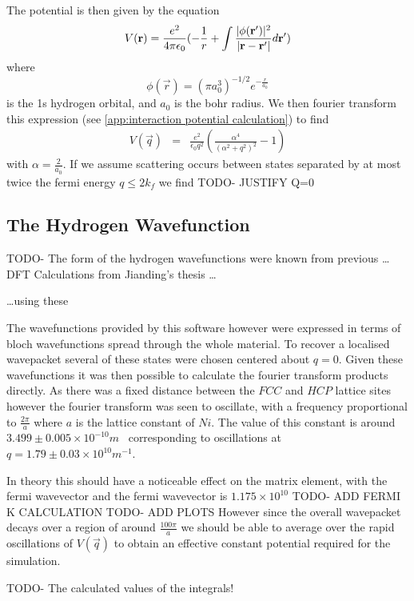 The potential is then given by the equation
\begin{equation}
    V(\mathbf{r}) = \frac{e^2}{4 \pi \epsilon_0}(
    -\frac{1}{r}
    + \int{\frac{\lvert\phi(\mathbf{r}')\rvert^2}{
            \lvert\mathbf{r} - \mathbf{r'}\rvert} d\mathbf{r}'})
\end{equation}
where
\begin{equation}
    \phi(\vec{r}) = {(\pi a_0^3)}^{-1/2} e^{-\frac{r}{a_0}}
\end{equation}
is the 1s hydrogen orbital, and \(a_0\) is
the bohr radius. We then fourier
transform this expression
(see \cref{app:interaction potential calculation})
to find
\begin{eqnarray}
    V(\vec{q}) &=& \frac{e^2}{\epsilon_0 q^2}(
    \frac{\alpha^4}{{(\alpha^2 + q^2)}^2} - 1
    )
\end{eqnarray}
with \(\alpha = \frac{2}{a_0}\). If we assume scattering
occurs between states separated by at most
twice the fermi energy \(q \leq 2k_f\) we find
TODO- JUSTIFY Q=0

\subsection{The Hydrogen Wavefunction}
TODO-
The form of the hydrogen wavefunctions were
known from previous \ldots DFT Calculations from Jianding's thesis \ldots


\ldots using these

The wavefunctions provided by this software however
were expressed in terms of bloch wavefunctions spread
through the whole material. To recover a localised
wavepacket several of these states were chosen
centered about \(q=0\). Given these wavefunctions
it was then possible to calculate the fourier
transform products directly. As there was a fixed
distance between the \(FCC\) and \(HCP\) lattice
sites however the fourier transform was seen to
oscillate, with a frequency proportional to
\(\frac{2\pi}{a}\) where \(a\) is the lattice
constant of \(Ni\). The value of this constant
is around \(3.499\pm{}0.005\times{}10^{-10}m\)~\cite{PhysRev.25.753}
corresponding to oscillations at
\(q = 1.79 \pm 0.03 \times{}10^{10}m^{-1}\).

In theory this should have a noticeable
effect on the matrix element, with the
fermi wavevector
and the fermi wavevector is \(1.175\times{}10^{10}\) TODO- ADD FERMI K CALCULATION
TODO- ADD PLOTS
However since the overall wavepacket decays over a region
of around \(\frac{100\pi}{a}\) we should be
able to average over the rapid oscillations of
\(V(\vec{q})\) to obtain an effective constant
potential required for the simulation.

TODO- The calculated values of the integrals!